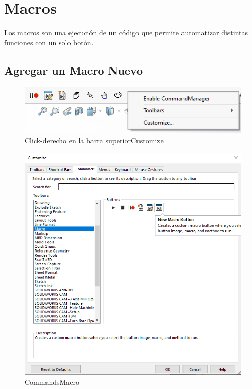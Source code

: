 \documentclass{report}
\begin{document}
\chapter{Macros}

Los macros son una ejecución de un código que permite automatizar distintas funciones con un solo botón.

\section{Agregar un Macro Nuevo}

	\begin{figure}[H]
	\centering
	\includegraphics[width=0.85\linewidth, height=0.5\textheight,keepaspectratio]{Imagenes/solidworks_macro_01}
	\caption{Click-derecho en la barra superior\textrightarrow Customize}
	\label{fig:solidworksmacro01}
\end{figure}

\begin{figure}[H]
	\centering
	\includegraphics[width=0.85\linewidth, height=0.5\textheight,keepaspectratio]{Imagenes/solidworks_macro_02}
	\caption{Commands\textrightarrow Macro}
	\label{fig:solidworksmacro02}
\end{figure}
\end{document}
